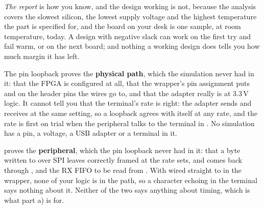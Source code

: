 \emph{The report} is how you know, and the design working is not, because the analysis covers the
slowest silicon, the lowest supply voltage and the highest temperature the part is specified for,
and the board on your desk is one sample, at room temperature, today. A design with negative slack
can work on the first try and fail warm, or on the next board; and nothing a working design does
tells you how much margin it has left.

 The pin loopback proves the \textbf{physical path}, which the simulation never had in it:
that the FPGA is configured at all, that the wrapper's pin assignment puts  and  on
the header pins the wires go to, and that the adapter really is at 3.3\,V logic. It cannot tell you that the terminal's rate is
right: the adapter sends and receives at the same setting, so a loopback agrees with itself at any
rate, and the rate is first on trial when the peripheral talks to the terminal in . No simulation has a pin, a voltage, a USB adapter
or a terminal in it.

 proves the \textbf{peripheral}, which the pin loopback never had in it: that a
byte written to  over SPI leaves  correctly framed at the rate
 sets, and comes back through ,  and the RX FIFO to be read
from . With  wired straight to  in the wrapper, none of your logic is
in the path, so a character echoing in the terminal says nothing about it. Neither of the two says
anything about timing, which is what part a) is for.
